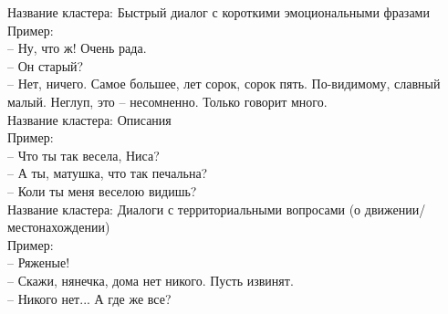\documentclass[a4paper,14pt]{article}
\begin{document}
Название кластера: Быстрый диалог с короткими эмоциональными фразами\\
Пример: \\
-- Ну, что ж! Очень рада. \\
-- Он старый? \\
-- Нет, ничего. Самое большее, лет сорок, сорок пять. По-видимому, славный малый. Неглуп, это – несомненно. Только говорит много. \\



Название кластера: Описания\\
Пример: \\
-- Что ты так весела, Ниса? \\
-- А ты, матушка, что так печальна? \\
-- Коли ты меня веселою видишь? \\



Название кластера: Диалоги с территориальными вопросами (о движении/местонахождении)\\
Пример: \\
-- Ряженые! \\
-- Скажи, нянечка, дома нет никого. Пусть извинят. \\
-- Никого нет... А где же все? \\
\end{document}
